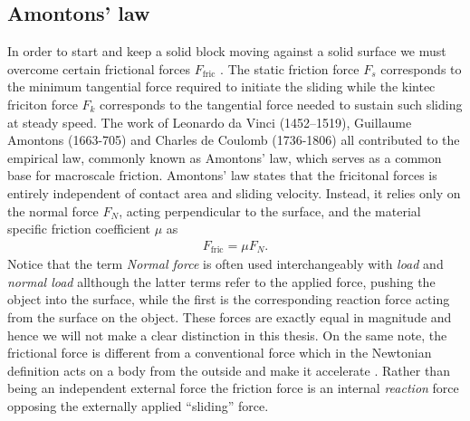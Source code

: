 \subsection{Amontons’ law}
 
 In order to start and keep a solid block moving against a solid surface we must
 overcome certain frictional forces $F_{\text{fric}}$ \cite{gnecco_meyer_2015}.
 The static friction force $F_s$ corresponds to the minimum tangential force
 required to initiate the sliding while the kintec friciton force $F_k$
 corresponds to the tangential force needed to sustain such sliding at steady
 speed. The work of Leonardo da Vinci (1452–1519), Guillaume Amontons (1663-705)
 and Charles de Coulomb (1736-1806) all contributed to the empirical law,
 commonly known as Amontons’ law, which serves as a common base for macroscale
 friction. Amontons’ law states that the fricitonal forces is entirely
 independent of contact area and sliding velocity. Instead, it relies only on
 the normal force $F_N$, acting perpendicular to the surface, and the material specific friction coefficient $\mu$ as
\begin{align}
  F_{\text{fric}} = \mu F_N.
  \label{eq:amonton}
\end{align}
Notice that the term \textit{Normal force} is often used interchangeably
with \textit{load} and \textit{normal load} allthough the latter terms refer to the applied force, pushing the object into the surface, while the first is the corresponding reaction force acting from the surface on the object. These forces are exactly equal in magnitude and hence we will not make a clear distinction in this thesis. On the same note, the frictional force is different from a conventional force which in the Newtonian definition acts on a body from the outside and make it accelerate \cite{gao_frictional_2004}. Rather than being an independent external force the friction force is an internal \textit{reaction} force opposing the externally applied ``sliding'' force. 


